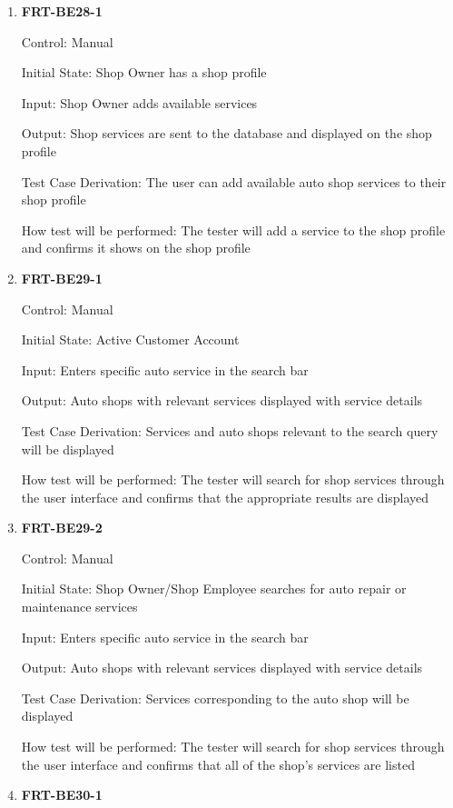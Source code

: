 \documentclass[12pt, titlepage]{article}
\begin{document}
\begin{enumerate}

	\item \textbf{FRT-BE28-1}

	      Control: Manual

	      Initial State: Shop Owner has a shop profile

	      Input: Shop Owner adds available services

	      Output: Shop services are sent to the database and displayed on the shop profile

	      Test Case Derivation: The user can add available auto shop services to their shop profile

	      How test will be performed: The tester will add a service to the shop profile and confirms it shows
	      on the shop profile

	\item \textbf{FRT-BE29-1}

	      Control: Manual

	      Initial State: Active Customer Account

	      Input: Enters specific auto service in the search bar

	      Output: Auto shops with relevant services displayed with service details

	      Test Case Derivation: Services and auto shops relevant to the search query will be displayed

	      How test will be performed: The tester will search for shop services through the user interface and
	      confirms that the appropriate results are displayed

	\item \textbf{FRT-BE29-2}

	      Control: Manual

	      Initial State: Shop Owner/Shop Employee searches for auto repair or maintenance services

	      Input: Enters specific auto service in the search bar

	      Output: Auto shops with relevant services displayed with service details

	      Test Case Derivation: Services corresponding to the auto shop will be displayed

	      How test will be performed: The tester will search for shop services through the user interface and
	      confirms that all of the shop's services are listed

	\item \textbf{FRT-BE30-1}


\end{enumerate}
\end{document}
